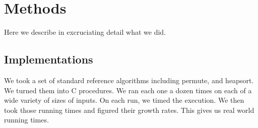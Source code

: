 \section{Methods}
  Here we describe in excruciating detail what we did.
  
  \subsection{Implementations}
  We took a set of standard reference algorithms including permute, and heapsort.
  We turned them into C procedures.
  We ran each one a dozen times on each of a wide variety of sizes of inputs.
  On each run, we timed the execution.
  We then took those running times and figured their growth rates.
  This gives us real world running times.

